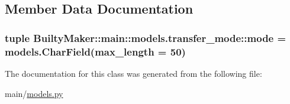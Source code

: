 \subsection{\-Member \-Data \-Documentation}
\hypertarget{classBuiltyMaker_1_1main_1_1models_1_1transfer__mode_af8ff9d47076db00c27d422590092d714}{
\subsubsection[{mode}]{\setlength{\rightskip}{0pt plus 5cm}tuple {\bf \-Builty\-Maker\-::main\-::models.\-transfer\-\_\-mode\-::mode} = models.\-Char\-Field(max\-\_\-length = 50)}}\label{classBuiltyMaker_1_1main_1_1models_1_1transfer__mode_af8ff9d47076db00c27d422590092d714}


\-The documentation for this class was generated from the following file\-:\begin{DoxyCompactItemize}
\item 
main/\hyperlink{models_8py}{models.\-py}\end{DoxyCompactItemize}
